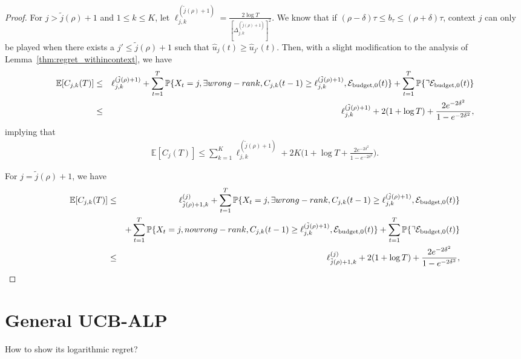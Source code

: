 \begin{proof}
For $j > \tilde{j}(\rho) + 1$ and $1 \leq k \leq K$, let $\ell_{j,k}^{(\tilde{j}(\rho)+1)} = \frac{2 \log T}{[\Delta_{j,k}^{(\tilde{j}(\rho)+1)}]^2}$. We know that if $(\rho - \delta) \tau \leq b_{\tau} \leq (\rho + \delta) \tau$, context $j$ can only be played when there exists a $j' \leq \tilde{j}(\rho)+1$ such that $\hat{u}_j(t) \geq \hat{u}_{j'}(t)$. Then, with a slight modification to the analysis of Lemma~\ref{thm:regret_withincontext}, we have
\begin{eqnarray}
\mathbb{E}[C_{j,k}(T)] &\leq& \ell_{j,k}^{(\tilde{j}(\rho)+1)} + \sum_{t = 1}^T \mathbb{P}\{X_t = j, \exists wrong-rank, C_{j,k}(t-1) \geq \ell_{j,k}^{(\tilde{j}(\rho)+1)}, \mathcal{E}_{\rm budget, 0}(t)\} + \sum_{t = 1}^T \mathbb{P}\{\urcorner\mathcal{E}_{\rm budget, 0}(t)\} \nonumber \\
&\leq&\ell_{j,k}^{(\tilde{j}(\rho)+1)} + 2(1 + \log T) + \frac{2e^{-2\delta^2}}{1 - e^{-2\delta^2}}, \nonumber
\end{eqnarray}
implying that
\begin{eqnarray} \label{eq:ub_supoptimal_context}
\mathbb{E}[C_j(T)] \leq \sum_{k=1}^K \ell_{j,k}^{(\tilde{j}(\rho)+1)} + 2K\big(1 + \log T + \frac{2e^{-2\delta^2}}{1 - e^{-2\delta^2}}\big).
\end{eqnarray}


For $j = \tilde{j}(\rho) + 1$, we have
\begin{eqnarray}
\mathbb{E}[C_{j,k}(T)] &\leq& \ell_{\tilde{j}(\rho)+1,k}^{(j)} + \sum_{t = 1}^T \mathbb{P}\{X_t = j, \exists wrong-rank, C_{j,k}(t-1) \geq \ell_{j,k}^{(\tilde{j}(\rho)+1)}, \mathcal{E}_{\rm budget, 0}(t)\} \nonumber \\
&& + \sum_{t = 1}^T \mathbb{P}\{X_t = j, no wrong-rank, C_{j,k}(t-1) \geq \ell_{j,k}^{(\tilde{j}(\rho)+1)}, \mathcal{E}_{\rm budget, 0}(t)\} + \sum_{t = 1}^T \mathbb{P}\{\urcorner\mathcal{E}_{\rm budget, 0}(t)\} \nonumber \\
&\leq&\ell_{\tilde{j}(\rho)+1,k}^{(j)} + 2(1 + \log T)  + \frac{2e^{-2\delta^2}}{1 - e^{-2\delta^2}}, \nonumber
\end{eqnarray}





\end{proof} 

\section{General UCB-ALP}

How to show its logarithmic regret?

